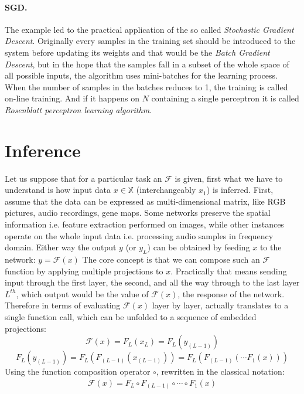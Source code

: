 \paragraph{SGD.} The example led to the practical application of the so called \emph{Stochastic Gradient Descent}.
Originally every samples in the training set should be introduced to the system before updating its weights and that would be the \emph{Batch Gradient Descent}, but in  the hope that the samples fall in a subset of the whole space of all possible inputs, the algorithm uses mini-batches for the learning process. When the number of samples in the batches reduces to 1, the training is called on-line training. And if it happens on $N$ containing a single perceptron it is called \emph{Rosenblatt perceptron learning algorithm}.


\section{Inference}
Let us suppose that for a particular task an $\mathcal{F}$ is given, first what we have to understand is how input data 
$x \in \mathbb{X}$ (interchangeably $x_1$) is inferred.
First, assume that the data can be expressed as multi-dimensional matrix, like RGB pictures, audio recordings, gene maps.
Some networks preserve the spatial information i.e. feature extraction performed on images, 
while other instances operate on the whole input data i.e. processing audio samples in frequency domain.
Either way the output $y$ (or $y_L$) can be obtained by feeding $x$ to the network: 
$ y = \mathcal{F}(x)$
The core concept is that we can compose such an $\mathcal{F}$ function by applying multiple projections to $x$.
Practically that means sending input through the first layer, the second, and all the way through to the last layer $L^{th}$, which output would be the value of $\mathcal{F}(x)$, the response of the network.
Therefore in terms of evaluating $\mathcal{F}(x)$ layer by layer, actually translates to a single function call, which can be unfolded to a sequence of embedded projections:
$$
    \mathcal{F}(x) = F_L \left( x_L \right) = F_L \left( y_{(L-1)} \right)
$$
$$
    F_L \left( y_{(L-1)} \right) = 
    F_L \left( F_{(L-1)} \left( x_{(L-1)} \right) \right) = F_L \left( F_{(L-1)}\left( \cdots F_1(x)\right)\right)
$$
Using the function composition operator $\circ$, rewritten in the classical notation:
\begin{equation}\label{eq:forward}
\begin{split}
    \mathcal{F}(x) = F_L \circ F_{(L-1)} \circ \cdots \circ F_1(x)
\end{split}
\end{equation}

